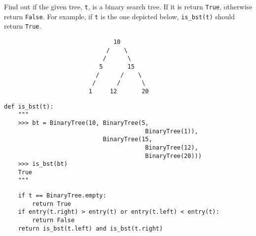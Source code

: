 \question 
Find out if the given tree, \texttt{t}, is a binary search tree. If it
is return \texttt{True}, otherwise return \texttt{False}.
For example, if \texttt{t} is the one depicted below, \texttt{is\_bst(t)}
should return \texttt{True}.

\vspace{8mm}

\begin{center}
\begin{lstlisting}
                               10
                             /    \
                            /      \
                           5       15
                          /      /    \
                         /      /      \
                        1     12       20

\end{lstlisting}
\end{center}
\vspace{8mm}
\begin{lstlisting}
def is_bst(t):
    """
    >>> bt = BinaryTree(10, BinaryTree(5, 
                                        BinaryTree(1)), 
                            BinaryTree(15, 
                                        BinaryTree(12), 
                                        BinaryTree(20)))
    >>> is_bst(bt)
    True
    """
\end{lstlisting}
\begin{solution}[1.25in]
\begin{lstlisting}
    if t == BinaryTree.empty:
        return True
    if entry(t.right) > entry(t) or entry(t.left) < entry(t):
        return False
    return is_bst(t.left) and is_bst(t.right)
\end{lstlisting}
\end{solution}
